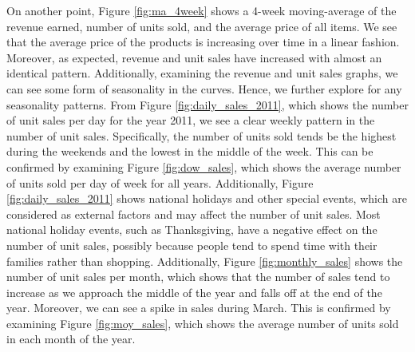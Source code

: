 On another point, Figure \ref{fig:ma_4week} shows a 4-week moving-average of the revenue earned, number of units sold, and the average price of all items.
We see that the average price of the products is increasing over time in a linear fashion. Moreover, as expected, revenue and unit sales have increased with almost an identical pattern. Additionally, examining the revenue and unit sales graphs, we can see some form of seasonality in the curves.
Hence, we further explore for any seasonality patterns. From Figure \ref{fig:daily_sales_2011}, which shows the number of unit sales per day for the year 2011, we see a clear weekly pattern in the number of unit sales.
Specifically, the number of units sold tends be the highest during the weekends and the lowest in the middle of the week. 
This can be confirmed by examining Figure \ref{fig:dow_sales}, which shows the average number of units sold per day of week for all years.
Additionally, Figure \ref{fig:daily_sales_2011} shows national holidays and other special events, which are considered as external factors and may affect the number of unit sales. 
Most national holiday events, such as Thanksgiving, have a negative effect on the number of unit sales, possibly because people tend to spend time with their families rather than shopping. 
Additionally, Figure \ref{fig:monthly_sales} shows the number of unit sales per month, which shows that the number of sales tend to increase as we approach the middle of the year and falls off at the end of the year.
Moreover, we can see a spike in sales during March.
This is confirmed by examining Figure \ref{fig:moy_sales}, which shows the average number of units sold in each month of the year. 

